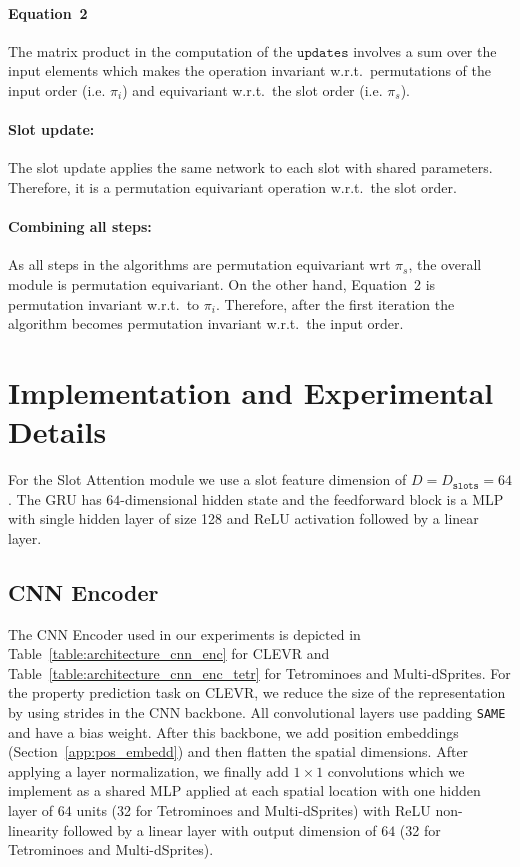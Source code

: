 \documentclass{article}
\newcommand{\slots}[0]{\texttt{slots}}
\newcommand{\sam}[0]{Slot Attention\xspace}
\newcommand{\updates}[0]{\texttt{updates}}
\begin{document}
\paragraph{Equation~2}
The matrix product in the computation of the $\updates$ involves a sum over the input elements which makes the operation invariant w.r.t.~permutations of the input order (i.e. $\pi_i$) and equivariant w.r.t.~the slot order (i.e. $\pi_s$).

\paragraph{Slot update:} The slot update applies the same network to each slot with shared parameters. Therefore, it is a permutation equivariant operation w.r.t.~the slot order.
\paragraph{Combining all steps:}
As all steps in the algorithms are permutation equivariant wrt $\pi_s$, the overall module is permutation equivariant. On the other hand, Equation~2 is permutation invariant w.r.t.~to $\pi_i$. Therefore, after the first iteration the algorithm becomes permutation invariant w.r.t.~the input order.

\section{Implementation and Experimental Details}\label{app:implementation_details}
For the \sam module we use a slot feature dimension of $D=D_{\slots}=64$. The GRU has $64$-dimensional hidden state and the feedforward block is a MLP with single hidden layer of size 128 and ReLU activation followed by a linear layer.

\subsection{CNN Encoder}\label{sec:app_cnn_enc}
The CNN Encoder used in our experiments is depicted in Table~\ref{table:architecture_cnn_enc} for CLEVR and Table~\ref{table:architecture_cnn_enc_tetr} for Tetrominoes and Multi-dSprites.
For the property prediction task on CLEVR, we reduce the size of the representation by using strides in the CNN backbone. All convolutional layers use padding \texttt{SAME} and have a bias weight. After this backbone, we add position embeddings (Section~\ref{app:pos_embedd}) and then flatten the spatial dimensions. After applying a layer normalization, we finally add $1\times 1$ convolutions which we implement as a shared MLP applied at each spatial location with one hidden layer of $64$ units (32 for Tetrominoes and Multi-dSprites) with ReLU non-linearity followed by a linear layer with output dimension of $64$ (32 for Tetrominoes and Multi-dSprites).
\end{document}
